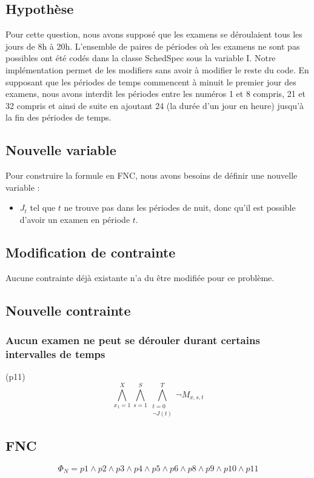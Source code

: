 \documentclass[a4paper,11pt]{article}
\begin{document}
\subsection{Hypothèse}
Pour cette question, nous avons supposé que les examens se déroulaient tous les jours de 8h à 20h. L'ensemble de paires de périodes où les examens ne sont pas possibles ont été codés dans la classe SchedSpec sous la variable I. Notre implémentation permet de les modifiers sans avoir à modifier le reste du code.
En supposant que les périodes de temps commencent à minuit le premier jour des examens, nous avons interdit les périodes entre les numéros 1 et 8 compris, 21 et 32 compris et ainsi de suite en ajoutant 24 (la durée d'un jour en heure) jusqu'à la fin des périodes de temps.

\subsection{Nouvelle variable}

Pour construire la formule en FNC, nous avons besoins de définir une nouvelle variable :  
\begin{itemize}
	\item \( J_{t}\) tel que $t$  ne trouve pas dans les périodes de nuit, donc qu'il est possible d'avoir un examen en période $t$.
\end{itemize}

\subsection{Modification de contrainte}
Aucune contrainte déjà existante n'a du être modifiée pour ce problème.

\subsection{Nouvelle contrainte}

\subsubsection{Aucun examen ne peut se dérouler durant certains intervalles de temps}
(p11)
\begin{displaymath}
\bigwedge\limits_{x_{1}=1}^{X}\bigwedge\limits_{s=1}^{S}\bigwedge\limits_{\substack{t=0 \\ \neg J(t) }}^{T} \neg M_{x, s, t}
\end{displaymath}

\subsection{FNC}
\begin{displaymath}
	\Phi_{N} = p1 \wedge p2 \wedge p3 \wedge p4 \wedge p5 \wedge p6 \wedge p8 \wedge p9 \wedge p10 \wedge p11
\end{displaymath}
\end{document}
